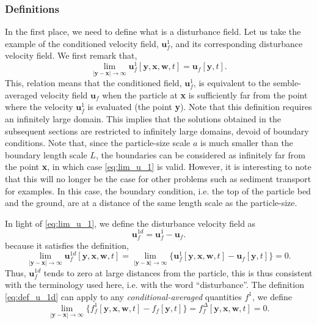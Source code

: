 \subsubsection{Definitions}

In the first place, we need to define what is a disturbance field.
Let us take the example of the conditioned velocity field, $\textbf{u}_f^1$, and its corresponding disturbance velocity field.
We first remark that,   
\begin{equation}
    \lim_{|\textbf{y}-\textbf{x}|\to\infty} 
    \textbf{u}_f^1[\textbf{y},\textbf{x},\textbf{w},t]
    =
    \textbf{u}_f[\textbf{y},t]. 
    \label{eq:lim_u_1}
\end{equation} 
This, relation means that the conditioned field, $\textbf{u}_f^1$, is equivalent to the semble-averaged velocity field $\textbf{u}_f$ when the particle at \textbf{x} is sufficiently far from the point where the velocity $\textbf{u}_f^1$ is evaluated (the point \textbf{y}). 
Note that this definition requires an infinitely large domain. 
This implies that the solutions obtained in the subsequent sections are restricted to infinitely large domains, devoid of boundary conditions.
Note that, since the particle-size scale $a$ is much smaller than the boundary length scale $L$, the boundaries can be considered as infinitely far from the point \textbf{x}, in which case \ref{eq:lim_u_1} is valid.
However, it is interesting to note that this will no longer be the case for other problems such as sediment transport for examples.
In this case, the boundary condition, i.e. the top of the particle bed and the ground, are at a distance of the same length scale as the particle-size. 

In light of \ref{eq:lim_u_1}, we define the disturbance velocity field as 
\begin{equation}
    \textbf{u}_f^{1d}
    =
    \textbf{u}_f^1 
    - 
    \textbf{u}_f. 
    \label{eq:def_u_1d}
\end{equation}
because it satisfies the definition, 
\begin{equation}
    \lim_{|\textbf{y}-\textbf{x}|\to\infty} 
    \textbf{u}_f^{1d}[\textbf{y},\textbf{x},\textbf{w},t]
    =
    \lim_{|\textbf{y}-\textbf{x}|\to\infty} 
    \{\textbf{u}_f^1[\textbf{y},\textbf{x},\textbf{w},t]
    - \textbf{u}_f[\textbf{y},t]\}
    = 0.
    \label{eq:lim_u_1d}
\end{equation} 
Thus, $\textbf{u}_f^{1d}$ tends to zero at large distances from the particle, this is thus consistent with the terminology used here, i.e. with the word ``disturbance''.
The definition \ref{eq:def_u_1d} can apply to any \textit{conditional-averaged} quantities $f^1$, we define
\begin{equation}
    \lim_{|\textbf{y}-\textbf{x}|\to\infty} 
    \{f_f^1[\textbf{y},\textbf{x},\textbf{w},t]
    - f_f[\textbf{y},t]\}
    =
    f_f^{\Delta}[\textbf{y},\textbf{x},\textbf{w},t]
    = 0.
\end{equation} 

